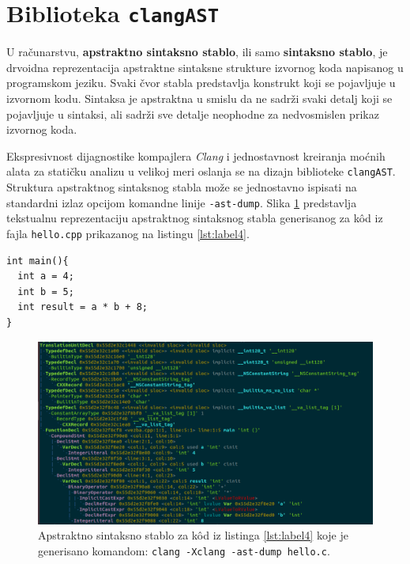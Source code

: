 \documentclass[12pt,oneside]{memoir}
\begin{document}

\section{Biblioteka \texttt{clangAST}}
\label{sec:clangASTSec}
U računarstvu, \textbf{apstraktno sintaksno stablo}, ili samo \textbf{sintaksno stablo}, je drvoidna reprezentacija apstraktne sintaksne strukture izvornog koda napisanog u programskom jeziku. Svaki čvor stabla predstavlja konstrukt koji se pojavljuje u izvornom kodu.
Sintaksa je apstraktna u smislu da ne sadr\v{z}i svaki detalj koji se pojavljuje u sintaksi, ali sadr\v{z}i sve detalje neophodne za nedvosmislen prikaz izvornog koda.

Ekspresivnost dijagnostike kompajlera \textit{Clang} i jednostavnost kreiranja mo\'{c}nih alata za stati\v{c}ku analizu u velikoj meri oslanja se na dizajn biblioteke \texttt{clangAST}. Struktura apstraktnog sintaksnog stabla mo\v{z}e se jednostavno ispisati na standardni izlaz opcijom komandne linije \texttt{-ast-dump}. Slika \ref{fig:ASTSlika} predstavlja tekstualnu reprezentaciju apstraktnog sintaksnog stabla generisanog za k\^{o}d iz fajla \texttt{hello.cpp} prikazanog na listingu \ref{lst:label4}.
\\

\begin{lstlisting}[style=customc, caption={K\^{o}d \v{c}ije je apstraktno sintaksno stablo prikazano na slici \ref{fig:ASTSlika}.},label=lst:label4]
int main(){
  int a = 4;
  int b = 5;
  int result = a * b + 8;
}
\end{lstlisting}

\begin{figure}[!ht]
  \centering
  \includegraphics[width=1.0\textwidth]{ASTImage.png}
  \caption{Apstraktno sintaksno stablo za k\^{o}d iz listinga \ref{lst:label4} koje je generisano komandom: \texttt{clang -Xclang -ast-dump hello.c}.}
  \label{fig:ASTSlika}
\end{figure}
\end{document}

